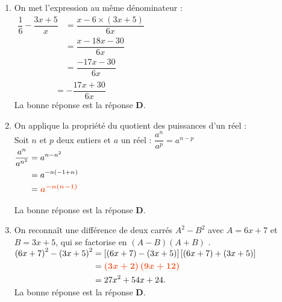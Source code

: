 \documentclass[a4paper,11pt]{article}
\begin{document}
\newpage
\begin{seance}{} %

\begin{enumerate}
\item On met l'expression au même dénominateur : \\$\begin{aligned}
        \dfrac{1}{6}-\dfrac{3x+5}{x}&=\dfrac{x-6\times \left(3x+5\right)}{6x}\\
        &=\dfrac{x -18x -30}{6x}\\
        &=\dfrac{-17x -30}{6x}\\
     \end{aligned}$\\$\phantom{\dfrac{1}{6}-\dfrac{3x+5}{x}}=-\dfrac{17x +30}{6x}$\\La bonne réponse est la réponse {\bfseries \color[HTML]{F15929}D}.

\item On applique la propriété du quotient des puissances d'un réel : \\
      Soit $n$ et $p$ deux entiers et $a$ un réel :  $\dfrac{a^n}{a^p}=a^{n-p}$\\
      $\begin{aligned} \dfrac{a^{n}}{a^{n^{2}}}&=a^{n-n^{2}}\\
      &=a^{-n(-1+n^{})}\\
      &={\color[HTML]{F15929}\boldsymbol{a^{-n(n^{}-1)}}}
      \end{aligned}$

\medskip
La bonne réponse est la réponse {\bfseries \color[HTML]{F15929}D}.

\item On reconnaît une différence de deux carrés $A^2-B^2$ avec $A=6x+7$ et $B=3x+5$, qui se factorise en $(A-B)(A+B)$ .\\
    $\begin{aligned}
    \left(6x+7\right)^2-\left(3x+5\right)^2&=\left[\left(6x+7\right)-\left(3x+5\right)\right]\left[\left(6x+7\right)+\left(3x+5\right)\right]\\
    &={\color[HTML]{F15929}\boldsymbol{\left(3x+2\right)\left(9x+12\right)}}\\
    &=27x^{2}+54x+24.
    \end{aligned}$\\La bonne réponse est la réponse {\bfseries \color[HTML]{F15929}D}.


\end{enumerate}
\end{seance}
\end{document}
